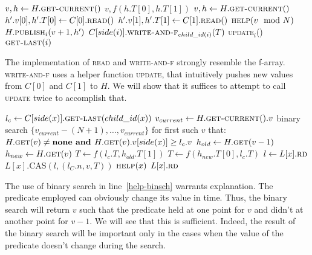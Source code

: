 \documentclass[a4paper,11pt]{article}
\def\none{\textbf{none} }
\newcommand{\fn}[1]{\textsc{#1}}
\begin{document}
\begin{algorithmic}[1]
		\State $v, h \gets H.\fn{get-current}()$ \label{get-getownver}
		\State \Return $v, f(h.T[0], h.T[1])$
	\EndFunction
		\State $v, h \gets H.\fn{get-current}()$ \label{upd-getown}
		\State $h'.v[0], h'.T[0] \gets C[0].\fn{read}()$ \label{upd-getch-0}
		\State $h'.v[1], h'.T[1] \gets C[1].\fn{read}()$ \label{upd-getch-1}
		\State $\fn{help}(v \mod N)$
		\State \Return $H.\fn{publish$_i$}(v+1, h')$ \label{upd-publish}
	\EndFunction
		\State $C[side(i)].\fn{write-and-f$_{child\_id(i)}$}(T)$ \label{upd-chupd}
		\If{\textbf{not} \fn{update$_i$}()} \label{updcall1}
		\State \fn{update$_i$}() \label{updcall2}
		\EndIf
		\State \Return $\fn{get-last}(i)$
	\EndFunction
\end{algorithmic}

The implementation of \fn{read} and \fn{write-and-f} strongly resemble the f-array. \fn{write-and-f} uses a helper function \fn{update}, that intuitively pushes new values from $C[0]$ and $C[1]$ to $H$.
We will show that it suffices to attempt to call \fn{update} twice to accomplish that.

\begin{algorithmic}[1]
		\State $l_c \gets C[side(x)].\fn{get-last}(child\_id(x))$ \label{get-last-recurse}
		\State $v_{current} \gets H.\fn{get-current}().v$
		\State binary search $\{v_{current}-(N+1),\ldots, v_{current}\}$ for first such $v$ that: \label{help-binsch}
		\Statex $H.\fn{get}(v) \neq \none \textbf{ and } H.\fn{get}(v).v[side(x)] \geq l_c.v$ %
			\State \Return
		\EndIf
		\State $h_{old} \gets H.\fn{get}(v-1)$ \label{help-getprev}
		\State $h_{new} \gets H.\fn{get}(v)$
		\If{$h_{old} = \none \textbf{ or } h_{new} = \none$}
			\State \Return
		\EndIf
		\State $T \gets f(l_c.T, h_{old}.T[1])$
		\Else
		\State $T \gets f(h_{new}.T[0], l_c.T)$
		\EndIf
		\State $l \gets L[x].\fn{rd}$
		 \label{upd-last-alreadydone}
			\State $L[x].\text{CAS}(l, (l_C.n, v, T))$
		\EndIf
	\EndFunction
		\State $\fn{help}(x)$
		\State \Return $L[x].\fn{rd}$
	\EndFunction
\end{algorithmic}

The use of binary search in line~\ref{help-binsch} warrants explanation. The predicate employed can obviously change its value in time. Thus, the binary search will return $v$ such that the predicate held at one point
for $v$ and didn't at another point for $v-1$. We will see that this is sufficient. Indeed, the result of the binary search will be important only in the cases when the value of the predicate doesn't change during
the search.
\end{document}
